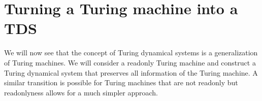 \section{Turning a Turing machine into a TDS} \label{tm_to_tds}

We will now see that the concept of Turing dynamical systems is a generalization of Turing machines.
We will consider a readonly Turing machine and construct a Turing dynamical system that preserves all information of the Turing machine.
A similar transition is possible for Turing machines that are not readonly but readonlyness allows for a much simpler approach.





